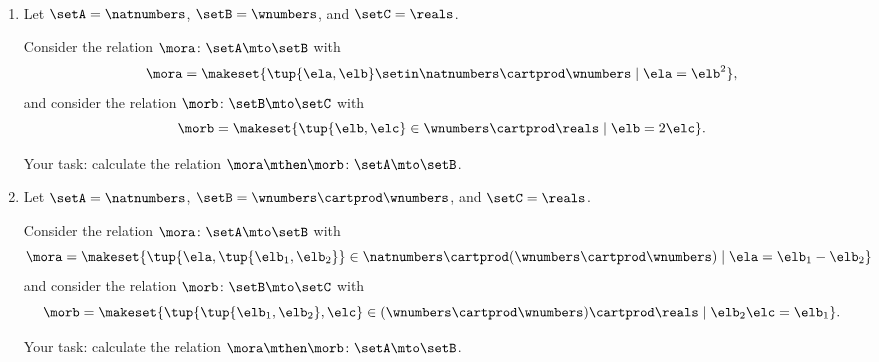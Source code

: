 

\begin{gradedexercise}[ComposingRelations]
\
\begin{enumerate}
       \item
       Let $\setA = \natnumbers$, $\setB = \wnumbers$, and $\setC = \reals$. 
       
       Consider the relation $\mora \colon \setA \mto \setB$ with
\begin{equation}
\mora = \makeset{ \tup{\ela, \elb} \setin \natnumbers \cartprod \wnumbers \mid \ela = \elb^2 },
\end{equation}
and consider the relation $\morb \colon \setB \mto \setC$ with
 \begin{equation}
\morb = \makeset{ \tup{\elb, \elc} \in \wnumbers \cartprod \reals \mid \elb = 2 \elc}.
       \end{equation}
       
       Your task: calculate the relation $\mora \mthen \morb \colon \setA \mto \setB$. 
       
       \item
       Let $\setA = \natnumbers$, $\setB = \wnumbers \cartprod \wnumbers$, and $\setC = \reals$. 
       
       Consider the relation $\mora \colon \setA \mto \setB$ with
       \begin{equation}
\mora = \makeset{\tup{\ela, \tup{\elb_1, \elb_2}} \in \natnumbers \cartprod (\wnumbers \cartprod \wnumbers) \mid \ela =  \elb_1 - \elb_2}
\end{equation}
and consider the relation $\morb \colon \setB \mto \setC$ with 
\begin{equation}
\morb = \makeset{ \tup{\tup{\elb_1, \elb_2}, \elc} \in (\wnumbers \cartprod \wnumbers) \cartprod \reals \mid \elb_2 \elc = \elb_1}.
\end{equation}

Your task: calculate the relation $\mora \mthen \morb \colon \setA \mto \setB$. 
\end{enumerate}

\end{gradedexercise}

